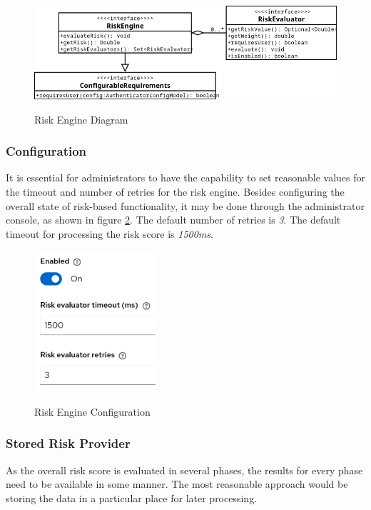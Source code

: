 \begin{figure}[htbp]
  \centering
  \includegraphics[width=1\textwidth]{img/sections/5-design/risk-engine.png}
  \label{fig:design-user-engine-diagram}
  \caption{Risk Engine Diagram}
\end{figure}

\subsubsection{Configuration}
It is essential for administrators to have the capability to set reasonable values for the timeout and number of retries for the risk engine.
Besides configuring the overall state of risk-based functionality, it may be done through the administrator console, as shown in figure \ref{fig:risk-based-enging-config}.
The default number of retries is \textit{3}.
The default timeout for processing the risk score is \textit{1500ms}.

\begin{figure}[htbp]
  \centering
  \includegraphics[width=0.4\textwidth]{img/sections/5-design/risk-based-engine-config.png}
  \label{fig:risk-based-enging-config}
  \caption{Risk Engine Configuration}
\end{figure}

\subsubsection{Stored Risk Provider}
As the overall risk score is evaluated in several phases, the results for every phase need to be available in some manner. 
The most reasonable approach would be storing the data in a particular place for later processing.

